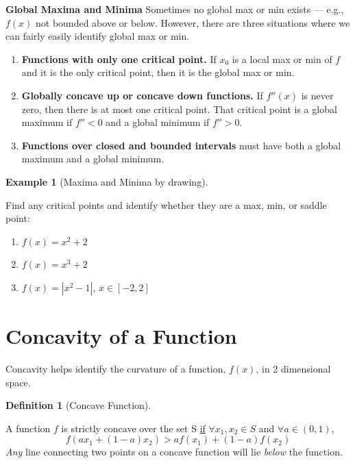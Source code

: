 \documentclass[
  letterpaper,
]{book}
\providecommand{\tightlist}{%
  \setlength{\itemsep}{0pt}\setlength{\parskip}{0pt}}\usepackage{longtable,booktabs,array}
\theoremstyle{definition}
\newtheorem{definition}{Definition}[chapter]
\theoremstyle{definition}
\newtheorem{example}{Example}[chapter]
\theoremstyle{plain}
\theoremstyle{definition}
\theoremstyle{plain}
\theoremstyle{plain}
\theoremstyle{remark}
\begin{document}
\textbf{Global Maxima and Minima} Sometimes no global max or min exists
--- e.g., \(f(x)\) not bounded above or below. However, there are three
situations where we can fairly easily identify global max or min.

\begin{enumerate}
\def\labelenumi{\arabic{enumi}.}
\tightlist
\item
  \textbf{Functions with only one critical point.} If \(x_0\) is a local
  max or min of \(f\) and it is the only critical point, then it is the
  global max or min.
\item
  \textbf{Globally concave up or concave down functions.} If \(f''(x)\)
  is never zero, then there is at most one critical point. That critical
  point is a global maximum if \(f''<0\) and a global minimum if
  \(f''>0\).
\item
  \textbf{Functions over closed and bounded intervals} must have both a
  global maximum and a global minimum.
\end{enumerate}

\leavevmode{}%
\begin{example}[Maxima and Minima by drawing]\label{exm-}

Find any critical points and identify whether they are a max, min, or
saddle point:

\begin{enumerate}
\def\labelenumi{\arabic{enumi}.}
\tightlist
\item
  \(f(x)=x^2+2\)
\item
  \(f(x)=x^3+2\)
\item
  \(f(x)=|x^2-1|\), \(x\in [-2,2]\)
\end{enumerate}

\end{example}

\hypertarget{concavity-of-a-function}{%
\section{Concavity of a Function}\label{concavity-of-a-function}}

Concavity helps identify the curvature of a function, \(f(x)\), in 2
dimensional space.

\leavevmode{}%
\begin{definition}[Concave Function]\label{def-}

A function \(f\) is strictly concave over the set S \underline{if}
\(\forall x_1,x_2 \in S\) and \(\forall a \in (0,1)\),
\[f(ax_1 + (1-a)x_2) > af(x_1) + (1-a)f(x_2)\] \textit{Any} line
connecting two points on a concave function will lie \textit{below} the
function.

\end{definition}
\end{document}
